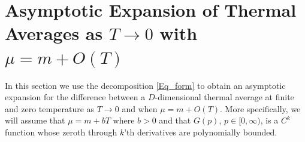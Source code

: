 \documentclass[sn-mathphys,Numbered]{sn-jnl}
\begin{document}

\section{Asymptotic Expansion of Thermal Averages as $T\to 0$ with $\mu=m+O(T)$}

In this section we use the decomposition \eqref{Eq_form} to obtain an asymptotic expansion for the difference between a $D$-dimensional thermal average at finite and zero temperature as $T\to 0$ and when $\mu=m+O(T)$.   More specifically, we will assume that $\mu=m+bT$ where $b>0$ and that $G(p)$, $p\in[0,\infty)$, is a $C^k$ function whose zeroth through $k$'th derivatives are polynomially bounded.
\end{document}
